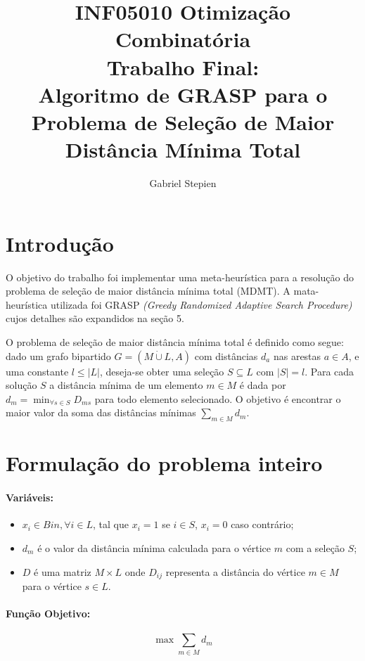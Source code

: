 \documentclass[12pt]{article}
\title{INF05010 Otimização Combinatória\\ Trabalho Final:\\Algoritmo de GRASP para o Problema de Seleção de Maior 
Distância Mínima Total
}
\author{Gabriel Stepien\inst{1}}
\begin{document}
 

\maketitle

\section{Introdução}

O objetivo do trabalho foi implementar uma meta-heurística para a resolução do problema de seleção de maior distância mínima total (MDMT). A mata-heurística utilizada foi GRASP \textit{(Greedy Randomized Adaptive Search Procedure)} cujos detalhes são expandidos na seção 5. 

O problema de seleção de maior distância mínima total é definido como segue: dado um grafo bipartido $G=(M \dot{\cup} L, A)$ com distâncias $d_a$ nas arestas $a \in A$, e uma constante $l \leq |L|$, deseja-se obter uma seleção $S \subseteq L $ com $|S| = l$. Para cada solução $S$ a distância mínima de um elemento $m \in M$ é dada por $d_m = \min_{\forall s \in S} D_{ms}$ para todo elemento selecionado. O objetivo é encontrar o maior valor da soma das distâncias mínimas $\sum_{m \in M}d_m$.


\section{Formulação do problema inteiro} \label{sec:firstpage}

\paragraph{Variáveis:} 
\begin{itemize}
\item $x_i \in Bin, \forall i \in L$, tal que $x_i = 1$ se $i \in S $, $x_i = 0$ caso contrário;
\item $d_m$ é o valor da distância mínima calculada para o vértice $m$ com a seleção $S$;
\item $D$ é uma matriz $M \times L$ onde $D_{ij}$ representa a distância do vértice $m\in M$ para o vértice $s \in L$.
\end{itemize}

\paragraph{Função Objetivo:}

\[ \max \sum_{m \in M}d_m \]
\end{document}

